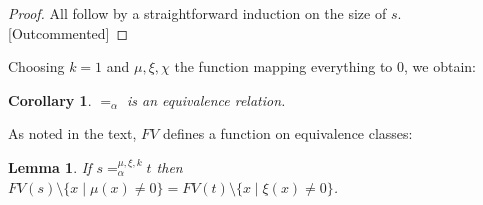 \documentclass{lmcs}
\theoremstyle{theorem}\newtheorem{theorem}[dummy]{Theorem}
\theoremstyle{theorem}\newtheorem{lemma}[dummy]{Lemma}
\theoremstyle{theorem}\newtheorem{corollary}[dummy]{Corollary}
\theoremstyle{definition}\newtheorem{definition}[dummy]{Definition}
\theoremstyle{definition}\newtheorem{example}[dummy]{Example}
\newcommand{\FV}{\mathit{FV}}
\newcommand{\identifier}[1]{\mathtt{#1}}
\newcommand{\afun}{\identifier{f}}
\newcommand{\abs}[2]{\lambda #1.#2}
\begin{document}
\begin{proof}
All follow by a straightforward induction on the size of $s$. [Outcommented]
%
%
%
\end{proof}

Choosing $k = 1$ and $\mu,\xi,\chi$ the function mapping everything to $0$, we obtain:

\begin{corollary}\label{corr:alphaequiv}
$=_\alpha$ is an equivalence relation.
\end{corollary}

As noted in the text, $\FV$ defines a function on equivalence classes:

\begin{lemma}\label{lem:alphafreevar}
If $s =_\alpha^{\mu,\xi,k} t$ then $\FV(s) \setminus \{ x \mid \mu(x) \neq 0 \} = \FV(t) \setminus \{ x \mid \xi(x) \neq 0 \}$.
\end{lemma}
\end{document}
